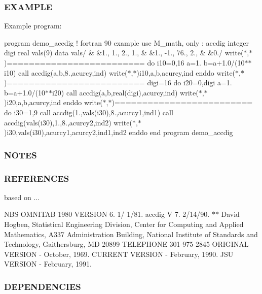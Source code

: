 \subsubsection*{E\+X\+A\+M\+P\+LE}

Example program\+:

program demo\+\_\+accdig ! fortran 90 example use M\+\_\+math, only \+: accdig integer digi real vals(9) data vals/ \& \&1., 1., 2., 1., \& \&1., -\/1., 76., 2., \& \&0./ write($\ast$,$\ast$)\textquotesingle{}=========================\textquotesingle{} do i10=0,16 a=1. b=a+1.0/(10$\ast$$\ast$i10) call accdig(a,b,8.,acurcy,ind) write($\ast$,$\ast$)i10,a,b,acurcy,ind enddo write($\ast$,$\ast$)\textquotesingle{}=========================\textquotesingle{} digi=16 do i20=0,digi a=1. b=a+1.0/(10$\ast$$\ast$i20) call accdig(a,b,real(digi),acurcy,ind) write($\ast$,$\ast$)i20,a,b,acurcy,ind enddo write($\ast$,$\ast$)\textquotesingle{}=========================\textquotesingle{} do i30=1,9 call accdig(1.,vals(i30),8.,acurcy1,ind1) call accdig(vals(i30),1.,8.,acurcy2,ind2) write($\ast$,$\ast$)i30,vals(i30),acurcy1,acurcy2,ind1,ind2 enddo end program demo\+\_\+accdig

\subsubsection*{N\+O\+T\+ES}

\subsubsection*{R\+E\+F\+E\+R\+E\+N\+C\+ES}

based on ...

N\+BS O\+M\+N\+I\+T\+AB 1980 V\+E\+R\+S\+I\+ON 6. 1/ 1/81. accdig V 7. 2/14/90. $\ast$$\ast$ David Hogben, Statistical Engineering Division, Center for Computing and Applied Mathematics, A337 Administration Building, National Institute of Standards and Technology, Gaithersburg, MD 20899 T\+E\+L\+E\+P\+H\+O\+NE 301-\/975-\/2845 O\+R\+I\+G\+I\+N\+AL V\+E\+R\+S\+I\+ON -\/ October, 1969. C\+U\+R\+R\+E\+NT V\+E\+R\+S\+I\+ON -\/ February, 1990. J\+SU V\+E\+R\+S\+I\+ON -\/ February, 1991.

\subsubsection*{D\+E\+P\+E\+N\+D\+E\+N\+C\+I\+ES}

